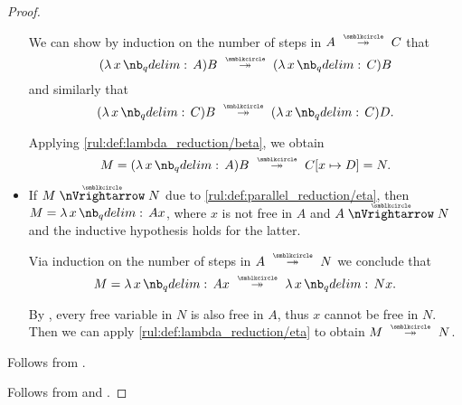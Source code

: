 \begin{proof}
\begin{itemize}
    We can show by induction on the number of steps in \( A \pred* C \) that
    \begin{equation*}
      (\qabs x A)B \pred* (\qabs x C)B
    \end{equation*}
    and similarly that
    \begin{equation*}
      (\qabs x C)B \pred* (\qabs x C)D.
    \end{equation*}

    Applying \ref{rul:def:lambda_reduction/beta}, we obtain
    \begin{equation*}
      M = (\qabs x A) B \pred* C[x \mapsto D] = N.
    \end{equation*}

    \item If \( M \ppred N \) due to \ref{rul:def:parallel_reduction/eta}, then \( M = \qabs x A x \), where \( x \) is not free in \( A \) and \( A \ppred N \) and the inductive hypothesis holds for the latter.

    Via induction on the number of steps in \( A \pred* N \) we conclude that
    \begin{equation*}
      M = \qabs x A x \pred* \qabs x N x.
    \end{equation*}

    By , every free variable in \( N \) is also free in \( A \), thus \( x \) cannot be free in \( N \). Then we can apply \ref{rul:def:lambda_reduction/eta} to obtain \( M \pred* N \).
  \end{itemize}

   Follows from .

   Follows from  and .
\end{proof}

